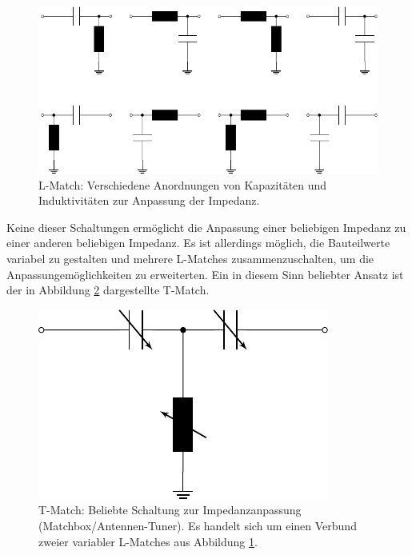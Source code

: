 \documentclass[twoside,a4paper,11pt,halfparskip,DIV=11,notitlepage]{scrartcl}
\begin{document}
\begin{figure}[H]
    \begin{center}\includegraphics{figures/matching_circuits/matching_circuits.pdf}\end{center}

    \caption{L-Match: Verschiedene Anordnungen von Kapazitäten und Induktivitäten zur Anpassung der Impedanz.}
    \label{fig:lmatch}
\end{figure}

Keine dieser Schaltungen ermöglicht die Anpassung einer beliebigen Impedanz zu
einer anderen beliebigen Impedanz. Es ist allerdings möglich, die Bauteilwerte
variabel zu gestalten und mehrere L-Matches zusammenzuschalten, um die
Anpassungemöglichkeiten zu erweiterten. Ein in diesem Sinn beliebter Ansatz 
ist der in Abbildung \ref{fig:tmatch} dargestellte T-Match.

\begin{figure}[H]
    \begin{center}\includegraphics{figures/t_match/t_match.pdf}\end{center}
    \caption{T-Match: Beliebte Schaltung zur Impedanzanpassung (Matchbox/Antennen-Tuner). Es handelt sich um einen
    Verbund zweier variabler L-Matches aus Abbildung \ref{fig:lmatch}.}
    \label{fig:tmatch}
\end{figure}
\end{document}
